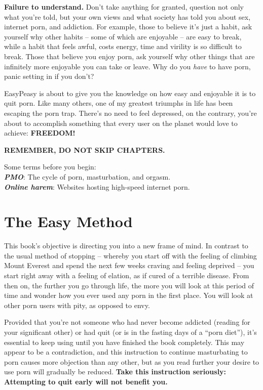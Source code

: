 \documentclass[
]{book}
\begin{document}
\textbf{Failure to understand.}
Don't take anything for granted, question not only what you're told, but your own views and what society has told you about sex, internet porn, and addiction. For example, those to believe it's just a habit, ask yourself why other habits -- some of which are enjoyable -- are easy to break, while a habit that feels awful, costs energy, time and virility is so difficult to break. Those that believe you enjoy porn, ask yourself why other things that are infinitely more enjoyable you can take or leave. Why do you \emph{have} to have porn, panic setting in if you don't?

EasyPeasy is about to give you the knowledge on how easy and enjoyable it is to quit porn. Like many others, one of my greatest triumphs in life has been escaping the porn trap. There's no need to feel depressed, on the contrary, you're about to accomplish something that every user on the planet would love to achieve: \textbf{FREEDOM!}

\textbf{REMEMBER, DO NOT SKIP CHAPTERS.}

Some terms before you begin:\\
\textbf{\emph{PMO}}: The cycle of porn, masturbation, and orgasm.\\
\textbf{\emph{Online harem}}: Websites hosting high-speed internet porn.

\hypertarget{the-easy-method}{%
\chapter{The Easy Method}\label{the-easy-method}}

This book's objective is directing you into a new frame of mind. In contrast to the usual method of stopping -- whereby you start off with the feeling of climbing Mount Everest and spend the next few weeks craving and feeling deprived -- you start right away with a feeling of elation, as if cured of a terrible disease. From then on, the further you go through life, the more you will look at this period of time and wonder how you ever used any porn in the first place. You will look at other porn users with pity, as opposed to envy.

Provided that you're not someone who had never become addicted (reading for your significant other) or had quit (or is in the fasting days of a ``porn diet''), it's essential to keep using until you have finished the book completely. This may appear to be a contradiction, and this instruction to continue masturbating to porn causes more objection than any other, but as you read further your desire to use porn will gradually be reduced. \textbf{Take this instruction seriously: Attempting to quit early will not benefit you.}
\end{document}
